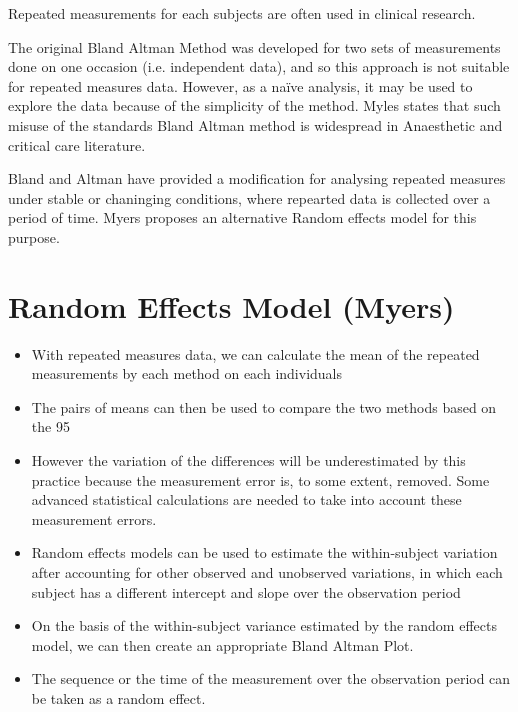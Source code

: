 \documentclass[MAIN.tex]{subfiles}
\begin{document}
Repeated measurements for each subjects are often used in clinical research.


The original Bland Altman Method was developed for two sets of measurements done on one occasion (i.e. independent data), and so this approach is not suitable for repeated measures data. However, as a naïve analysis, it may be used to explore the data because of the simplicity of the method. Myles states that such misuse of the standards Bland Altman method is widespread in Anaesthetic and critical care literature.

Bland and Altman have provided a modification for analysing repeated measures under stable or chaninging conditions, where repearted data is collected over a period of time. 
Myers proposes an alternative Random effects model for this purpose.

\section{Random Effects Model  (Myers)}
\begin{itemize}
\item	With repeated measures data, we can calculate the mean of the repeated measurements by each method on each individuals
\item	The pairs of means can then be used to compare the two methods based on the 95%
\item	However the variation of the differences will be underestimated by this practice because the measurement error is, to some extent, removed. Some advanced statistical calculations are needed to take into account these measurement errors.
\item	Random effects models can be used to estimate the within-subject variation after accounting for other observed and unobserved variations, in which each subject has a different intercept and slope over the observation period
\item	On the basis of the within-subject variance estimated by the random effects model, we can then create an appropriate Bland Altman Plot.
\item	The sequence or the time of the measurement over the observation period can be taken as a random effect.
\end{itemize}
\end{document}
